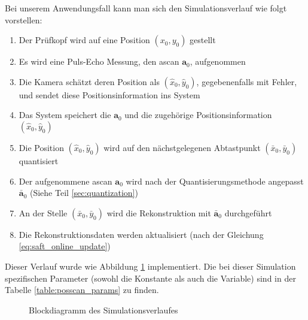 Bei unserem Anwendungsfall kann man sich den Simulationsverlauf wie folgt vorstellen: 
\begin{enumerate}
\item Der Prüfkopf wird auf eine Position $(x_0, y_0)$ gestellt 
\item Es wird eine Puls-Echo Messung, den \gls{ascan} $\bm{a}_0$, aufgenommen
\item Die Kamera schätzt deren Position als $(\hat{x}_0, \hat{y}_0)$, gegebenenfalls mit Fehler, und sendet diese Positionsinformation ins System
\item Das System speichert die $\bm{a}_0$ und die zugehörige Positionsinformation $(\hat{x}_0, \hat{y}_0)$
\item Die Position $(\hat{x}_0, \hat{y}_0)$ wird auf den nächstgelegenen Abtastpunkt  $(\bar{x}_0, \bar{y}_0)$ quantisiert
\item Der aufgenommene \gls{ascan} $\bm{a}_0$ wird nach der Quantisierungsmethode angepasst $\bar{\bm{a}}_0$ (Siehe Teil \ref{sec:quantization})
\item An der Stelle $(\bar{x}_0, \bar{y}_0)$ wird die Rekonstruktion mit $\bar{\bm{a}}_0$ durchgeführt
\item Die Rekonstruktionsdaten werden aktualisiert (nach der Gleichung \ref{eq:saft_online_update})
\end{enumerate}
Dieser Verlauf wurde wie Abbildung \ref{fig:posscan_blockdiagram} implementiert. Die bei dieser Simulation spezifischen Parameter (sowohl die Konstante als auch die Variable) sind in der Tabelle \ref{table:posscan_params} zu finden. \par
\begin{figure}[h!]
\begin{center}
\caption{Blockdiagramm des Simulationsverlaufes}
\label{fig:posscan_blockdiagram}
\end{center}
\end{figure}



